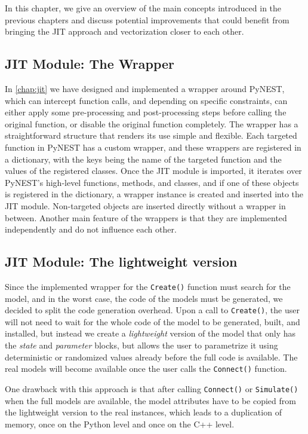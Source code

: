 In this chapter, we give an overview of the main concepts introduced in the previous chapters and discuss potential improvements that could benefit from bringing the JIT approach and vectorization closer to each other.

\subsection*{JIT Module: The Wrapper}

In \autoref{chap:jit} we have designed and implemented a wrapper around PyNEST, which can intercept function calls, and depending on specific constraints, can either apply some pre-processing and post-processing steps before calling the original function, or disable the original function completely. The wrapper has a straightforward structure that renders its use simple and flexible. Each targeted function in PyNEST has a custom wrapper, and these wrappers are registered in a dictionary, with the keys being the name of the targeted function and the values of the registered classes. Once the JIT module is imported, it iterates over PyNEST's high-level functions, methods, and classes, and if one of these objects is registered in the dictionary, a wrapper instance is created and inserted into the JIT module. Non-targeted objects are inserted directly without a wrapper in between. Another main feature of the wrappers is that they are implemented independently and do not influence each other.

\subsection*{JIT Module: The lightweight version}
Since the implemented wrapper for the \texttt{Create()} function must search for the model, and in the worst case, the code of the models must be generated, we decided to split the code generation overhead. Upon a call to \texttt{Create()}, the user will not need to wait for the whole code of the model to be generated, built, and installed, but instead we create a \emph{lightweight} version of the model that only has the \emph{state} and \emph{parameter} blocks, but allows the user to parametrize it using deterministic or randomized values already before the full code is available. The real models will become available once the user calls the \texttt{Connect()} function.

One drawback with this approach is that after calling \texttt{Connect()} or \texttt{Simulate()} when the full models are available, the model attributes have to be copied from the lightweight version to the real instances, which leads to a duplication of memory, once on the Python level and once on the C++ level.

